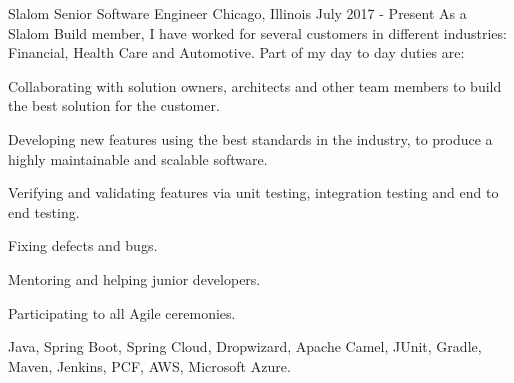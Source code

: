 
\begin{cventries}

  \experienceentry
  {Slalom} %
    {Senior Software Engineer} %
    {Chicago, Illinois} %
    {July 2017 - Present} %
    {As a Slalom Build member, I have worked for several customers in different industries: Financial, Health Care and Automotive. Part of my day to day duties are:}
    {
      \begin{cvitems} %
      	\item {Collaborating with solution owners, architects and other team members to build the best solution for the customer.}
      	\item {Developing new features using the best standards in the industry, to produce a highly maintainable and scalable software.}
      	\item {Verifying and validating features via unit testing, integration testing and end to end testing.}
      	\item {Fixing defects and bugs.}
      	\item {Mentoring and helping junior developers.}
        \item {Participating to all Agile ceremonies.}
      \end{cvitems}
    }
    {Java, Spring Boot, Spring Cloud, Dropwizard, Apache Camel, JUnit, Gradle, Maven, Jenkins, PCF, AWS, Microsoft Azure.}
  

\end{cventries}
